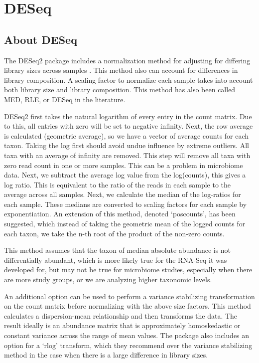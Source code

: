 \documentclass[
]{book}
\begin{document}
\hypertarget{deseq}{%
\section{DESeq}\label{deseq}}

\hypertarget{about-deseq}{%
\subsection{About DESeq}\label{about-deseq}}

The DESeq2 package includes a normalization method for adjusting for differing library sizes across samples \citep{anders2010}. This method also can account for differences in library composition. A scaling factor to normalize each sample takes into account both library size and library composition. This method has also been called MED, RLE, or DESeq in the literature.

DESeq2 first takes the natural logarithm of every entry in the count matrix. Due to this, all entries with zero will be set to negative infinity. Next, the row average is calculated (geometric average), so we have a vector of average counts for each taxon. Taking the log first should avoid undue influence by extreme outliers. All taxa with an average of infinity are removed. This step will remove all taxa with zero read count in one or more samples. This can be a problem in microbiome data. Next, we subtract the average log value from the log(counts), this gives a log ratio. This is equivalent to the ratio of the reads in each sample to the average across all samples. Next, we calculate the median of the log-ratios for each sample. These medians are converted to scaling factors for each sample by exponentiation. An extension of this method, denoted `poscounts', has been suggested, which instead of taking the geometric mean of the logged counts for each taxon, we take the n-th root of the product of the non-zero counts.

This method assumes that the taxon of median absolute abundance is not differentially abundant, which is more likely true for the RNA-Seq it was developed for, but may not be true for microbiome studies, especially when there are more study groups, or we are analyzing higher taxonomic levels.

An additional option can be used to perform a variance stabilizing transformation on the count matrix before normalizing with the above size factors. This method calculates a dispersion-mean relationship and then transforms the data. The result ideally is an abundance matrix that is approximately homoskedastic or constant variance across the range of mean values. The package also includes an option for a `rlog' transform, which they recommend over the variance stabilizing method in the case when there is a large difference in library sizes.
\end{document}
